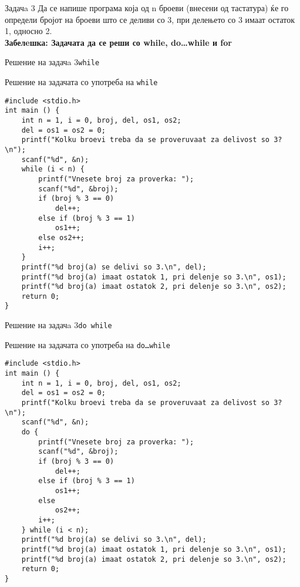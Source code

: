 \begin{frame}[fragile]{Задачa 3}
Да се напише програма која од n броеви (внесени од тастатура) ќе го определи бројот на броеви што се деливи со 3, при делењето со 3 имаат остаток 1, односно 2.\\
\textbf{Забелeшка: Задачата да се реши со while, do…while и for}
\end{frame}


\begin{frame}[fragile]{Решение на задачa 3}{\texttt{while}}
\begin{exampleblock}{Решение на задачата со употреба на \texttt{while}}
\begin{lstlisting}
#include <stdio.h> 
int main () { 
    int n = 1, i = 0, broj, del, os1, os2; 
    del = os1 = os2 = 0; 
    printf("Kolku broevi treba da se proveruvaat za delivost so 3?\n"); 
    scanf("%d", &n); 
    while (i < n) { 
        printf("Vnesete broj za proverka: "); 
        scanf("%d", &broj); 
        if (broj % 3 == 0) 
            del++; 
        else if (broj % 3 == 1) 
            os1++;
        else os2++; 
        i++; 
    }
    printf("%d broj(a) se delivi so 3.\n", del); 
    printf("%d broj(a) imaat ostatok 1, pri delenje so 3.\n", os1); 
    printf("%d broj(a) imaat ostatok 2, pri delenje so 3.\n", os2); 
    return 0; 
} 
\end{lstlisting}
\end{exampleblock}
\end{frame}


\begin{frame}[fragile]{Решение на задачa 3}{\texttt{do while}}
\begin{exampleblock}{Решение на задачата со употреба на \texttt{do\ldots while}}
\begin{lstlisting}
#include <stdio.h>
int main () { 
    int n = 1, i = 0, broj, del, os1, os2; 
    del = os1 = os2 = 0;
    printf("Kolku broevi treba da se proveruvaat za delivost so 3?\n"); 
    scanf("%d", &n); 
    do { 
        printf("Vnesete broj za proverka: "); 
        scanf("%d", &broj); 
        if (broj % 3 == 0) 
            del++; 
        else if (broj % 3 == 1) 
            os1++; 
        else 
            os2++; 
        i++; 
    } while (i < n); 
    printf("%d broj(a) se delivi so 3.\n", del); 
    printf("%d broj(a) imaat ostatok 1, pri delenje so 3.\n", os1); 
    printf("%d broj(a) imaat ostatok 2, pri delenje so 3.\n", os2); 
    return 0; 
}
\end{lstlisting}
\end{exampleblock}
\end{frame}


